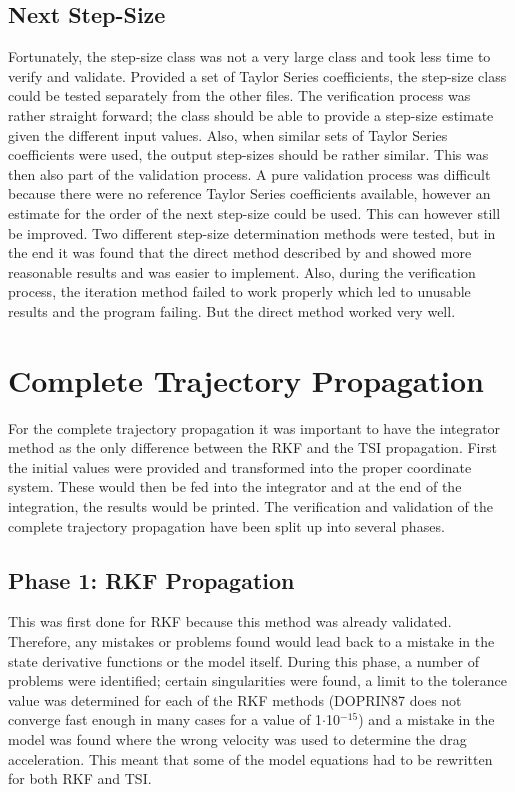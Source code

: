 \subsection{Next Step-Size}
\label{subsec:nextStepSizeverval}
Fortunately, the step-size class was not a very large class and took less time to verify and validate. Provided a set of Taylor Series coefficients, the step-size class could be tested separately from the other files. The verification process was rather straight forward; the class should be able to provide a step-size estimate given the different input values. Also, when similar sets of Taylor Series coefficients were used, the output step-sizes should be rather similar. This was then also part of the validation process. A pure validation process was difficult because there were no reference Taylor Series coefficients available, however an estimate for the order of the next step-size could be used. This can however still be improved. Two different step-size determination methods were tested, but in the end it was found that the direct method described by \cite{scott2008high} and \cite{bergsma2015application} showed more reasonable results and was easier to implement. Also, during the verification process, the iteration method failed to work properly which led to unusable results and the program failing. But the direct method worked very well.




\section{Complete Trajectory Propagation}
\label{sec:propverval}
For the complete trajectory propagation it was important to have the integrator method as the only difference between the \ac{RKF} and the \ac{TSI} propagation. First the initial values were provided and transformed into the proper coordinate system. These would then be fed into the integrator and at the end of the integration, the results would be printed. The verification and validation of the complete trajectory propagation have been split up into several phases.


\subsection{Phase 1: \ac{RKF} Propagation}
\label{subsec:phase1com}
This was first done for \ac{RKF} because this method was already validated. Therefore, any mistakes or problems found would lead back to a mistake in the state derivative functions or the model itself.
During this phase, a number of problems were identified; certain singularities were found, a limit to the tolerance value was determined for each of the \ac{RKF} methods (\ac{DOPRIN87} does not converge fast enough in many cases for a value of 1$\cdot$10$^{-15}$) and a mistake in the model was found where the wrong velocity was used to determine the drag acceleration. This meant that some of the model equations had to be rewritten for both \ac{RKF} and \ac{TSI}. 

